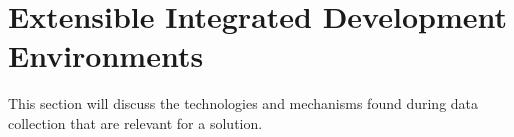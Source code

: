 \section{Extensible Integrated Development Environments}

This section will discuss the technologies and mechanisms found during data collection that are relevant for a solution.





